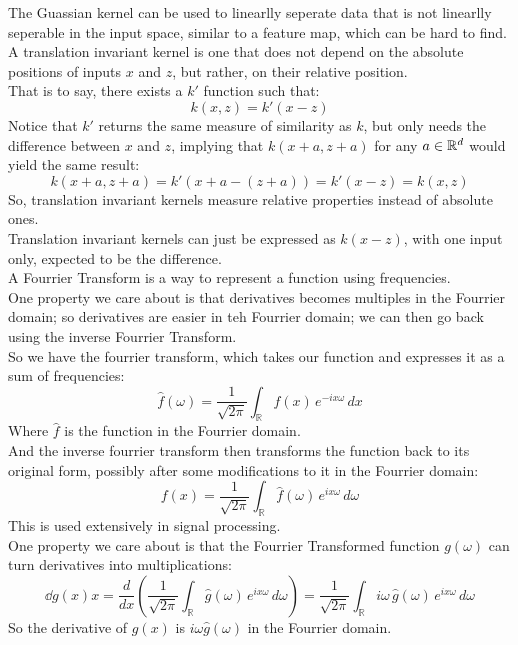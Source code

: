 \documentclass[12pt]{article}
\begin{document}
The Guassian kernel can be used to linearlly seperate
data that is not linearlly seperable in the input space,
similar to a feature map, which can be hard to
find. \\

A translation invariant kernel is one that does
not depend on the absolute positions of inputs $x$
and $z$, but rather, on their relative position. \\
That is to say, there exists a $k'$ function
such that:
\[ k(x, z) = k'(x - z) \]
Notice that $k'$ returns the same measure of
similarity as $k$, but only needs the difference
between $x$ and $z$, implying that $k(x + a, z+a)$
for any $a \in \mathbb{R}^d$ would yield the same
result:
\[ k(x + a, z+a) = k'(x+a - (z + a)) 
= k'(x - z) = k(x, z) \]
So, translation invariant kernels measure 
relative properties instead of absolute ones. \\

Translation invariant kernels can just be
expressed as $k(x -z)$, with one input only,
expected to be the difference. \\

A Fourrier Transform is a way to represent a function
using frequencies. \\
One property we care about is that
derivatives becomes multiples in the Fourrier domain;
so derivatives are easier in teh Fourrier domain;
we can then go back using the inverse Fourrier 
Transform. \\

So we have the fourrier transform,
which takes our function and expresses it as
a sum of frequencies:
\[ \hat{f}(\omega) = \frac{1}{\sqrt{2\pi}} 
\int_{\mathbb{R}} f(x)\, e^{-i x \omega} \, dx\] 
Where $\hat{f}$ is the function in the Fourrier
domain. \\
And the inverse fourrier transform then
transforms the function back to its original
form, possibly after some modifications to it
in the Fourrier domain:
\[ f(x) = \frac{1}{\sqrt{2\pi}} \int_{\mathbb{R}} 
\hat{f}(\omega)\, e^{i x \omega} \, d\omega\]
This is used extensively in signal processing. \\

One property we care about is that the
Fourrier Transformed function $g(\omega)$
can turn derivatives into multiplications:
\[ \dd{g(x)}{x} = \frac{d}{dx} 
\left( \frac{1}{\sqrt{2\pi}} 
\int_{\mathbb{R}} \hat{g}(\omega)\, e^{i x \omega} 
\, d\omega \right) = \frac{1}{\sqrt{2\pi}} 
\int_{\mathbb{R}} i \omega\, \hat{g}(\omega)\, 
e^{i x \omega} \, d\omega \]
So the derivative of $g(x)$
is $i\omega \hat{g}(\omega)$ in the Fourrier
domain. \\
\end{document}
